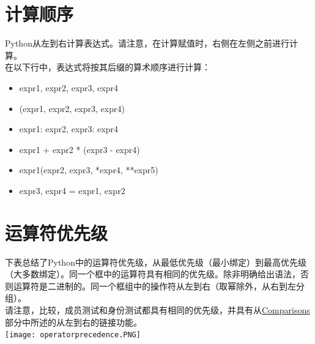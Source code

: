 \documentclass[10pt,UTF8]{ctexart}
\begin{document}
\section{计算顺序}
Python从左到右计算表达式。请注意，在计算赋值时，右侧在左侧之前进行计算。\\
\indent 在以下行中，表达式将按其后缀的算术顺序进行计算：\\
\begin{itemize}
\item expr1, expr2, expr3, expr4
\item (expr1, expr2, expr3, expr4)
\item {expr1: expr2, expr3: expr4}
\item expr1 + expr2 * (expr3 - expr4)
\item expr1(expr2, expr3, *expr4, **expr5)
\item expr3, expr4 = expr1, expr2
\end{itemize}
\section{运算符优先级}
下表总结了Python中的运算符优先级，从最低优先级（最小绑定）到最高优先级（大多数绑定）。同一个框中的运算符具有相同的优先级。除非明确给出语法，否则运算符是二进制的。同一个框组中的操作符从左到右（取幂除外，从右到左分组）。\\
\indent 请注意，比较，成员测试和身份测试都具有相同的优先级，并具有从\href{https://docs.python.org/3/reference/expressions.html#comparisons}{Comparisons}部分中所述的从左到右的链接功能。\\
\texttt{[image: operatorprecedence.PNG]} 
\end{document}
